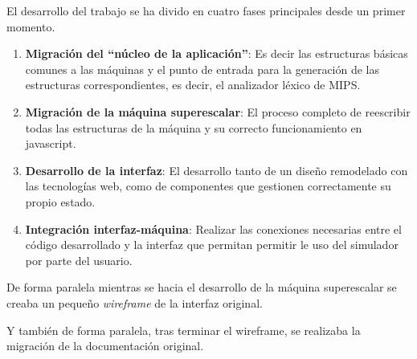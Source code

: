 El desarrollo del trabajo se ha divido en cuatro fases principales desde un
primer momento.

\begin{enumerate}
   \item \textbf{Migración del “núcleo de la aplicación”}: Es decir las estructuras básicas 
   comunes a las máquinas y el punto de entrada para la generación de las estructuras 
   correspondientes, es decir, el analizador léxico de MIPS.

   \item \textbf{Migración de la máquina superescalar}: El proceso completo de reescribir 
   todas las estructuras de la máquina y su correcto funcionamiento en javascript.

   \item \textbf{Desarrollo de la interfaz}: El desarrollo tanto de un diseño remodelado 
   con las tecnologías web, como de componentes que gestionen correctamente su propio estado.
   
   \item \textbf{Integración interfaz-máquina}: Realizar las conexiones necesarias entre el 
   código desarrollado y la interfaz que permitan permitir le uso del simulador por parte del usuario.

\end{enumerate}

De forma paralela mientras se hacia el desarrollo de la máquina superescalar se creaba 
un pequeño \textit{wireframe} de la interfaz original. 

\bigskip
Y también de forma paralela, tras terminar el wireframe, se realizaba la migración 
de la documentación original.